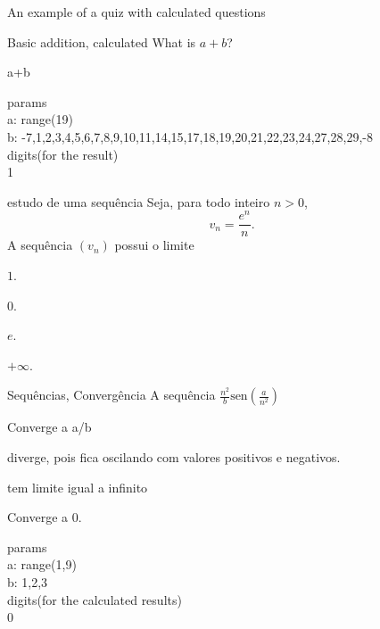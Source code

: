 \documentclass[12pt]{article}
\begin{document}
\begin{quiz}{An example of a quiz with calculated questions}
\begin{numerical}[points=2]{Basic addition, calculated}
  What is ${a}+{b}$?
  \item {a}+{b}
  \end{numerical}
  params\\
  a: range(19)\\
  b: -7,1,2,3,4,5,6,7,8,9,10,11,14,15,17,18,19,20,21,22,23,24,27,28,29,-8\\
  digits(for the result)\\
  1

  \begin{multi}{estudo de uma sequência}
  Seja, para todo inteiro $n>0$, \[v_n=\frac{e^n}{n}.\]
  A sequência $(v_n)$ possui o limite
  \item $1$.
  \item $0$.
  \item $e$.
  \item* $+\infty$.
  \end{multi}


\begin{multi}[multiple]{Sequências, Convergência}
A sequência $\displaystyle \frac{n^2}{{b}} \text{sen}\left(\frac{{a}}{n^{2}}\right)$
\item* Converge a {a}/{b}
\item diverge, pois fica oscilando com valores positivos e negativos.
\item tem limite igual a infinito
\item Converge a 0.
\end{multi}
params\\
a: range(1,9)\\
b: 1,2,3\\
digits(for the calculated results)\\
0
\end{quiz}
\end{document}
